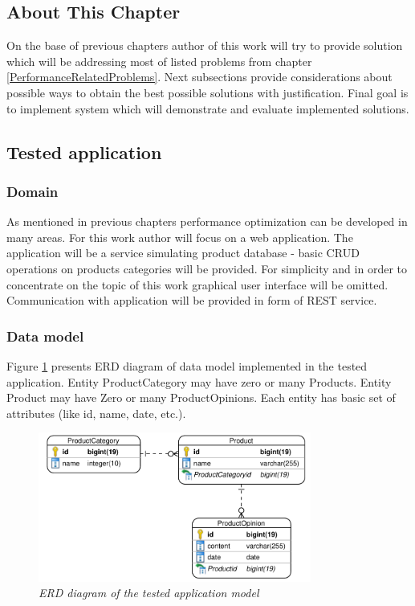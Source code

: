 \documentclass[12pt,a4paper]{article}
\begin{document}
\subsection{About This Chapter}
On the base of previous chapters author of this work will try to provide solution which will be addressing most of listed problems from chapter \ref{PerformanceRelatedProblems}. Next subsections provide considerations about possible ways to obtain the best possible solutions with justification. Final goal is to implement system which will demonstrate and evaluate implemented solutions. 

\subsection{Tested application}   \label{testedApplicaiotn}
\subsubsection{Domain} 
As mentioned in previous chapters performance optimization can be developed in many areas. For this work author will focus on a web application. The application will be a service simulating product database - basic CRUD operations on products categories will be provided. For simplicity and in order to concentrate on the topic of this work graphical user interface will be omitted. Communication with application will be provided in form of REST service.

\subsubsection{Data model} 
Figure \ref{erd} presents ERD diagram of data model implemented in the tested application. Entity ProductCategory may have zero or many Products. Entity Product may have Zero or many ProductOpinions. Each entity has basic set of attributes (like id, name, date, etc.).  

\begin{figure}[h]
\centering
\includegraphics[width=0.8\textwidth]{ERD}
\caption{\textit{ERD diagram of the tested application model}}
\label{erd}
\end{figure}
\end{document}
